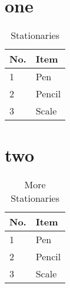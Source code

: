 \documentclass{article}
\begin{document}
	
	\section{one}
	\lipsum[1-2]
	
	\begin{table}[b] %
		\centering
		\begin{tabular}{|l|l|}
			\hline
			No. & Item \\
			\hline
			1 & Pen \\
			\hline
			2 & Pencil \\
			\hline
			3 & Scale \\
			\hline
		\end{tabular}
	\caption{Stationaries}
	\end{table}

\section{two}
\lipsum[1-3]

\begin{table}[h] %
	\centering
	\begin{tabular}{|l|l|}
		\hline
		No. & Item \\
		\hline
		1 & Pen \\
		\hline
		2 & Pencil \\
		\hline
		3 & Scale \\
		\hline
	\end{tabular}
	\caption{More Stationaries}
\end{table}
\end{document}
